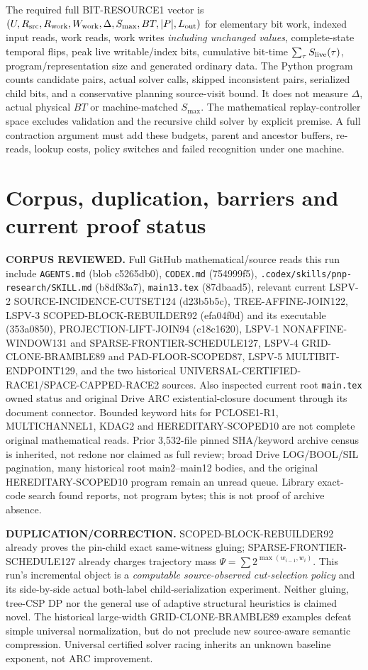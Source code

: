 \documentclass[11pt]{article}
\begin{document}
The required full BIT-RESOURCE1 vector is $(U,R_{\rm src},R_{\rm work},W_{\rm work},\Delta,S_{\max},BT,|P|,L_{\rm out})$ for elementary bit work, indexed input reads, work reads, work writes \emph{including unchanged values}, complete-state temporal flips, peak live writable/index bits, cumulative bit-time $\sum_\tau S_{\rm live}(\tau)$, program/representation size and generated ordinary data. The Python program counts candidate pairs, actual solver calls, skipped inconsistent pairs, serialized child bits, and a conservative planning source-visit bound. It does not measure $\Delta$, actual physical $BT$ or machine-matched $S_{\max}$. The mathematical replay-controller space excludes validation and the recursive child solver by explicit premise. A full contraction argument must add these budgets, parent and ancestor buffers, re-reads, lookup costs, policy switches and failed recognition under one machine.

\section{Corpus, duplication, barriers and current proof status}
\textbf{CORPUS REVIEWED.} Full GitHub mathematical/source reads this run include \texttt{AGENTS.md} (blob c5265db0), \texttt{CODEX.md} (754999f5), \texttt{.codex/skills/pnp-research/SKILL.md} (b8df83a7), \texttt{main13.tex} (87dbaad5), relevant current LSPV-2 SOURCE-INCIDENCE-CUTSET124 (d23b5b5c), TREE-AFFINE-JOIN122, LSPV-3 SCOPED-BLOCK-REBUILDER92 (efa04f0d) and its executable (353a0850), PROJECTION-LIFT-JOIN94 (c18c1620), LSPV-1 NONAFFINE-WINDOW131 and SPARSE-FRONTIER-SCHEDULE127, LSPV-4 GRID-CLONE-BRAMBLE89 and PAD-FLOOR-SCOPED87, LSPV-5 MULTIBIT-ENDPOINT129, and the two historical UNIVERSAL-CERTIFIED-RACE1/SPACE-CAPPED-RACE2 sources. Also inspected current root \texttt{main.tex} owned status and original Drive ARC existential-closure document through its document connector. Bounded keyword hits for PCLOSE1-R1, MULTICHANNEL1, KDAG2 and HEREDITARY-SCOPED10 are not complete original mathematical reads. Prior 3,532-file pinned SHA/keyword archive census is inherited, not redone nor claimed as full review; broad Drive LOG/BOOL/SIL pagination, many historical root main2--main12 bodies, and the original HEREDITARY-SCOPED10 program remain an unread queue. Library exact-code search found reports, not program bytes; this is not proof of archive absence.

\textbf{DUPLICATION/CORRECTION.} SCOPED-BLOCK-REBUILDER92 already proves the pin-child exact same-witness gluing; SPARSE-FRONTIER-SCHEDULE127 already charges trajectory mass $\Psi=\sum 2^{\max(w_{i-1},w_i)}$. This run's incremental object is a \emph{computable source-observed cut-selection policy} and its side-by-side actual both-label child-serialization experiment. Neither gluing, tree-CSP DP nor the general use of adaptive structural heuristics is claimed novel. The historical large-width GRID-CLONE-BRAMBLE89 examples defeat simple universal normalization, but do not preclude new source-aware semantic compression. Universal certified solver racing inherits an unknown baseline exponent, not ARC improvement.
\end{document}
